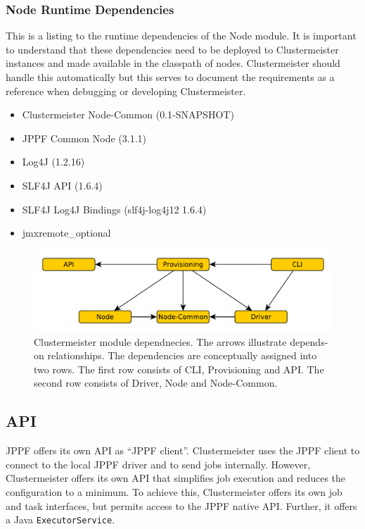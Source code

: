\documentclass[12pt]{article}
\begin{document}
\subsubsection{Node Runtime Dependencies}
This is a listing to the runtime dependencies of the Node module. It is important to understand that these dependencies need to be deployed to Clustermeister instances and made available in the classpath of nodes. Clustermeister should handle this automatically but this serves to document the requirements as a reference when debugging or developing Clustermeister.

\begin{itemize}
 \item Clustermeister Node-Common (0.1-SNAPSHOT)
 \item JPPF Common Node (3.1.1)
 \item Log4J (1.2.16)
 \item SLF4J API (1.6.4)
 \item SLF4J Log4J Bindings (slf4j-log4j12 1.6.4)
 \item jmxremote\_optional
\end{itemize}

\begin{figure}[hp]
\centering
\includegraphics[scale=0.7]{images/module-deps.pdf}
\caption{Clustermeister module dependnecies. The arrows illustrate depends-on relationships. The dependencies are conceptually assigned into two rows. The first row consists of CLI, Provisioning and API. The second row consists of Driver, Node and Node-Common.}
\label{fig:deps}
\end{figure}

\subsection{API}

JPPF offers its own API as ``JPPF client''. Clustermeister uses the JPPF client to connect to the local JPPF driver and to send jobs internally. However, Clustermeister offers its own API that simplifies job execution and reduces the configuration to a minimum. To achieve this, Clustermeister offers its own job and task interfaces, but permits access to the JPPF native API. Further, it offers a Java \texttt{ExecutorService}.
\end{document}
